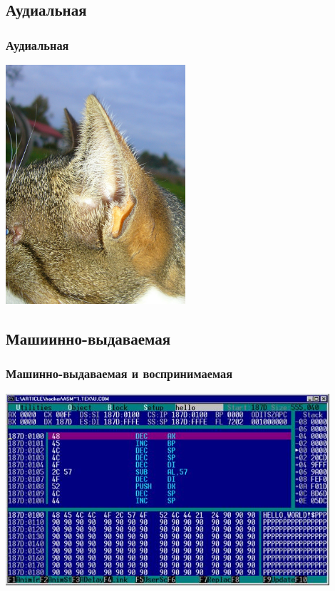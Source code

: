 \documentclass[compress,red]{beamer}
\begin{document}
\subsection{Аудиальная}
\begin{frame}[fragile]
  \frametitle{Аудиальная}
  \centerline{\includegraphics[width=0.5\textwidth]{images/cat_ear.jpeg}}
\end{frame}

\subsection{Машиинно-выдаваемая}
\begin{frame}[fragile]
  \frametitle{Машинно-выдаваемая и воспринимаемая}
  \centerline{\includegraphics[width=0.9\textwidth]{images/computer_info.jpeg}}
\end{frame}
\end{document}
